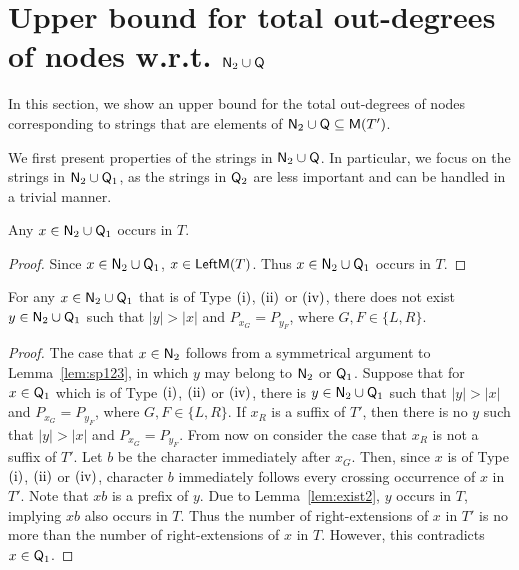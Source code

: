 \section{Upper bound for total out-degrees of nodes w.r.t. $\mathsf{N}_{\mathrm{2}} \cup \mathsf{Q}$}
\label{sec:upper_bound_2}

In this section, we show an upper bound for the total out-degrees of nodes corresponding to strings that are elements of $\mathsf{N}_{\mathrm{2}} \cup \mathsf{Q} \subseteq \mathsf{M}(T')$.

We first present properties of the strings in $\mathsf{N}_{\mathrm{2}} \cup \mathsf{Q}$.
In particular, we focus on the strings in $\mathsf{N}_{\mathrm{2}} \cup \mathsf{Q}_{\mathrm{1}}$,
as the strings in $\mathsf{Q}_{\mathrm{2}}$ are less important and can be handled in a trivial manner.

  \begin{lemma} \label{lem:exist2}
    Any $x \in \mathsf{N}_{\mathrm{2}} \cup \mathsf{Q}_{\mathrm{1}}$ occurs in $T$.
  \end{lemma}

  \begin{proof}
    Since $x \in \mathsf{N}_{\mathrm{2}} \cup \mathsf{Q}_{\mathrm{1}}$, $x \in \mathsf{LeftM}(T)$. Thus $x \in \mathsf{N}_{\mathrm{2}} \cup \mathsf{Q}_{\mathrm{1}}$ occurs in $T$.
  \end{proof}

  \begin{lemma} \label{lem:sp124}
    For any $x \in \mathsf{N}_{\mathrm{2}} \cup \mathsf{Q}_{\mathrm{1}}$ that is of Type $\rm{(i)}$, $\rm{(ii)}$ or $\rm{(iv)}$,
    there does not exist $y\in \mathsf{N}_{\mathrm{2}} \cup \mathsf{Q}_{\mathrm{1}}$ such that $|y|>|x|$ and $P_{x_{G}}=P_{y_{F}}$, where $G,F \in \{L,R\}$.
  \end{lemma}

  \begin{proof}
    The case that $x \in \mathsf{N}_{\mathrm{2}}$ follows from a symmetrical argument to Lemma~\ref{lem:sp123}, in which $y$ may belong to $\mathsf{N}_{\mathrm{2}}$ or $\mathsf{Q}_{\mathrm{1}}$.
    Suppose that for $x \in \mathsf{Q}_{\mathrm{1}}$ which is of Type $\rm{(i)}$, $\rm{(ii)}$ or $\rm{(iv)}$,
    there is $y\in \mathsf{N}_{\mathrm{2}} \cup \mathsf{Q}_{\mathrm{1}}$ such that $|y|>|x|$ and $P_{x_{G}}=P_{y_{F}}$, where $G,F \in \{L,R\}$.
    If $x_R$ is a suffix of $T'$, then there is no $y$ such that $|y|>|x|$ and $P_{x_{G}}=P_{y_{F}}$.
    From now on consider the case that $x_R$ is not a suffix of $T'$.
    Let $b$ be the character immediately after $x_{G}$.
    Then, since $x$ is of Type $\rm{(i)}$, $\rm{(ii)}$ or $\rm{(iv)}$,
    character $b$ immediately follows every crossing occurrence of $x$ in $T'$.
    Note that $xb$ is a prefix of $y$.
    Due to Lemma~\ref{lem:exist2}, $y$ occurs in $T$,
    implying $xb$ also occurs in $T$.
    Thus the number of right-extensions of $x$ in $T'$
    is no more than the number of right-extensions of $x$ in $T$.
    However, this contradicts $x \in \mathsf{Q}_{\mathrm{1}}$.
  \end{proof}

